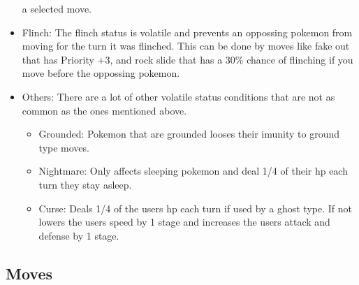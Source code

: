 \begin{itemize}
    a selected move.
  \item Flinch: The flinch status is volatile and prevents an oppossing pokemon from moving for the turn it was flinched. This can be done by moves like 
    fake out that has Priority +3, and rock slide that has a 30\% chance of flinching if you move before the oppossing pokemon.
  \item Others: There are a lot of other volatile status conditions that are not as common as the ones mentioned above.
  \begin{itemize}
    \item Grounded: Pokemon that are grounded looses their imunity to ground type moves.
    \item Nightmare: Only affects sleeping pokemon and deal 1/4 of their hp each turn they stay asleep.
    \item Curse: Deals 1/4 of the users hp each turn if used by a ghost type. If not lowers the users speed by 1 stage and increases 
      the users attack and defense by 1 stage.
  \end{itemize}
\end{itemize}
\subsection{Moves}
